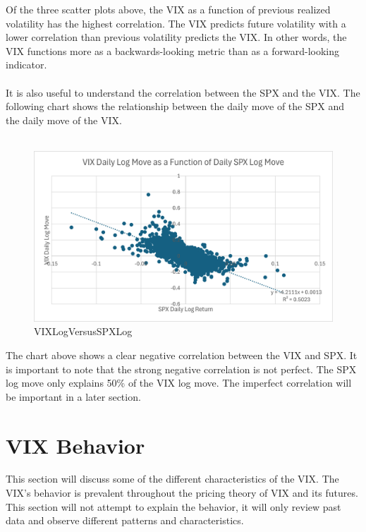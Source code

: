\documentclass[11pt, oneside]{book}
\begin{document}
\noindent
Of the three scatter plots above, the VIX as a function of previous realized volatility has the highest correlation. The VIX predicts future volatility with a lower correlation than previous volatility predicts the VIX. In other words, the VIX functions more as a backwards-looking metric than as a forward-looking indicator. \\
\\
It is also useful to understand the correlation between the SPX and the VIX. The following chart shows the relationship between the daily move of the SPX and the daily move of the VIX.
\\
\\
\begin{figure}[H]
\centering
\includegraphics[width=\textwidth]{SPXCorrelationWithVIX.png}
\caption{VIXLogVersusSPXLog} \label{Fig-VIXLogSPXLog}
\end{figure}
\noindent
The chart above shows a clear negative correlation between the VIX and SPX. It is important to note that the strong negative correlation is not perfect. The SPX log move only explains 50\% of the VIX log move. The imperfect correlation will be important in a later section.\\

\section{VIX Behavior} \label{SigOfVIX-VIXBehave}
This section will discuss some of the different characteristics of the VIX. The VIX's behavior is prevalent throughout the pricing theory of VIX and its futures. This section will not attempt to explain the behavior, it will only review past data and observe different patterns and characteristics.\\
\end{document}
